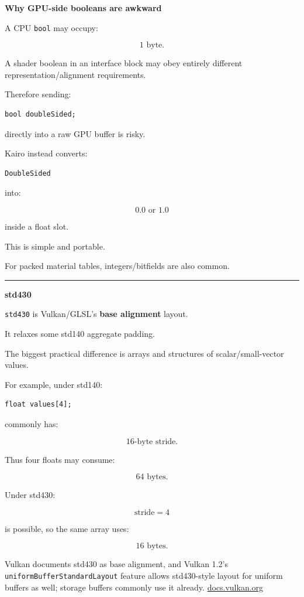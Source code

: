 \textbf{Why GPU-side booleans are awkward}

A CPU \texttt{bool} may occupy:

\[
1\text{ byte}.
\]

A shader boolean in an interface block may obey entirely different representation/alignment requirements.

Therefore sending:

\begin{verbatim}
bool doubleSided;
\end{verbatim}

directly into a raw GPU buffer is risky.

Kairo instead converts:

\begin{verbatim}
DoubleSided
\end{verbatim}

into:

\[
0.0\text{ or }1.0
\]

inside a float slot.

This is simple and portable.

For packed material tables, integers/bitfields are also common.

\begin{center}\rule{0.5\linewidth}{0.5pt}\end{center}

\textbf{std430}

\texttt{std430} is Vulkan/GLSL's \textbf{base alignment} layout.

It relaxes some std140 aggregate padding.

The biggest practical difference is arrays and structures of scalar/small-vector values.

For example, under std140:

\begin{verbatim}
float values[4];
\end{verbatim}

commonly has:

\[
16\text{-byte stride}.
\]

Thus four floats may consume:

\[
64\text{ bytes}.
\]

Under std430:

\[
\text{stride}=4
\]

is possible, so the same array uses:

\[
16\text{ bytes}.
\]

Vulkan documents std430 as base alignment, and Vulkan 1.2's \texttt{uniformBufferStandardLayout} feature allows std430-style layout for uniform buffers as well; storage buffers commonly use it already. \href{https://docs.vulkan.org/guide/latest/shader_memory_layout.html?utm_source=chatgpt.com}{docs.vulkan.org}

